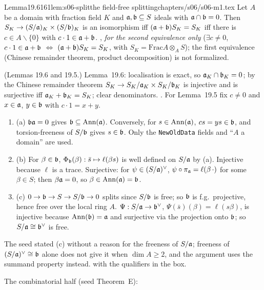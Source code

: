 \begin{quoted}{Lemma}{19.6}{161}{lem:s06-split}{the field-free splitting}{chapters/s06/s06-m1.tex}\label{rpt:lem:s06-split}
Let $A$ be a domain with fraction field $K$ and $\mathfrak{a},\mathfrak{b}\subseteq S$ ideals with $\mathfrak{a}\cap\mathfrak{b}=0$. Then
$S_K\to(S/\mathfrak{a})_K\times(S/\mathfrak{b})_K$ is an isomorphism iff $(\mathfrak{a}+\mathfrak{b})S_K=S_K$ iff there is $c\in A\smallsetminus\{0\}$ with
$c\cdot1\in\mathfrak{a}+\mathfrak{b}$. \stproved{} , \stformalized{} \emph{for the second equivalence only} ($\exists c\ne0$, $c\cdot1\in\mathfrak{a}+\mathfrak{b}$ $\iff$ $(\mathfrak{a}+\mathfrak{b})S_K=S_K$, with $S_K=\mathrm{Frac}A\otimes_AS$); the first equivalence (Chinese remainder theorem, product decomposition) is not formalized.
\end{quoted}
\begin{outline}(Lemmas 19.6 and 19.5.)
Lemma~19.6: localisation is exact, so $\mathfrak{a}_K\cap\mathfrak{b}_K=0$; by the Chinese remainder theorem $S_K\to S_K/\mathfrak{a}_K\times S_K/\mathfrak{b}_K$ is injective and is
surjective iff $\mathfrak{a}_K+\mathfrak{b}_K=S_K$; clear denominators. \stproved. For Lemma~19.5 fix $c\ne0$ and $x\in\mathfrak{a}$, $y\in\mathfrak{b}$ with $c\cdot1=x+y$.
\begin{enumerate}[label=(\arabic*)]
\item (a) $\mathfrak{b}\mathfrak{a}=0$ gives $\mathfrak{b}\subseteq\operatorname{Ann}(\mathfrak{a})$. Conversely, for $s\in\operatorname{Ann}(\mathfrak{a})$, $cs=ys\in\mathfrak{b}$, and torsion-freeness of $S/\mathfrak{b}$ gives $s\in\mathfrak{b}$.
  Only the \texttt{NewOldData} fields and ``$A$ a domain'' are used. \stproved
\item (b) For $\beta\in\mathfrak{b}$, $\Phi_{\mathfrak{b}}(\beta):\bar s\mapsto\ell(\beta s)$ is well defined on $S/\mathfrak{a}$ by (a). Injective because $\ell$ is a trace.
  Surjective: for $\psi\in(S/\mathfrak{a})^\vee$, $\psi\circ\pi_{\mathfrak{a}}=\ell(\beta\,\cdot)$ for some $\beta\in S$; then $\beta\mathfrak{a}=0$, so $\beta\in\operatorname{Ann}(\mathfrak{a})=\mathfrak{b}$. \stproved
\item (c) $0\to\mathfrak{b}\to S\to S/\mathfrak{b}\to0$ splits since $S/\mathfrak{b}$ is free; so $\mathfrak{b}$ is f.g.\ projective, hence free over the local ring $A$.
  $\Psi:S/\mathfrak{a}\to\mathfrak{b}^\vee$, $\Psi(\bar s)(\beta)=\ell(s\beta)$, is injective because $\operatorname{Ann}(\mathfrak{b})=\mathfrak{a}$ and surjective via the projection onto $\mathfrak{b}$;
  so $S/\mathfrak{a}\cong\mathfrak{b}^\vee$ is free. \stproved
\end{enumerate}
The seed stated (c) without a reason for the freeness of $S/\mathfrak{a}$; freeness of $(S/\mathfrak{a})^\vee\cong\mathfrak{b}$ alone does not give it when $\dim A\ge2$,
and the argument uses the summand property instead. \stformal{} with the qualifiers in the box.
\end{outline}

\noindent The combinatorial half (seed Theorem~E):


